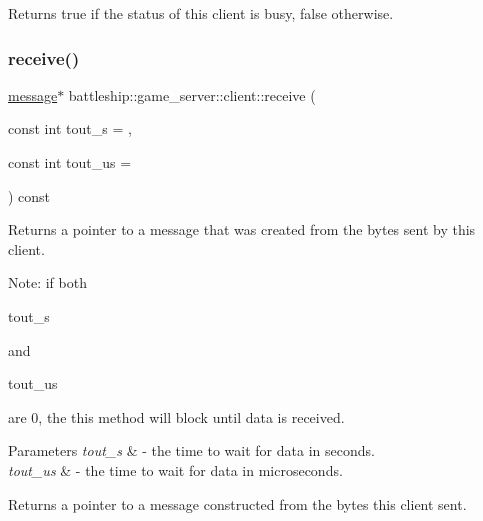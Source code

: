 \begin{DoxyReturn}{Returns}
true if the status of this client is busy, false otherwise. 
\end{DoxyReturn}
\mbox{\label{classbattleship_1_1game__server_1_1client_a9824ce38f2f62979bd307487c862db9f}} 
\subsubsection{\texorpdfstring{receive()}{receive()}}
{\footnotesize\ttfamily \hyperlink{classbattleship_1_1network__message_1_1message}{message}$\ast$ battleship\+::game\+\_\+server\+::client\+::receive (\begin{DoxyParamCaption}\item[{const int}]{tout\+\_\+s = {},  }\item[{const int}]{tout\+\_\+us = {} }\end{DoxyParamCaption}) const\hspace{0.3cm}{\ttfamily [inline]}}

Returns a pointer to a message that was created from the bytes sent by this client.

Note\+: if both
\begin{DoxyCode}
tout\_s 
\end{DoxyCode}
 and
\begin{DoxyCode}
tout\_us 
\end{DoxyCode}
 are 0, the this method will block until data is received.


\begin{DoxyParams}{Parameters}
{\em tout\+\_\+s} & -\/ the time to wait for data in seconds. \\
\hline
{\em tout\+\_\+us} & -\/ the time to wait for data in microseconds. \\
\hline
\end{DoxyParams}
\begin{DoxyReturn}{Returns}
a pointer to a message constructed from the bytes this client sent. 
\end{DoxyReturn}
\mbox{\label{classbattleship_1_1game__server_1_1client_a8f594fcecac15941f7fee46a0340bfe4}} 
